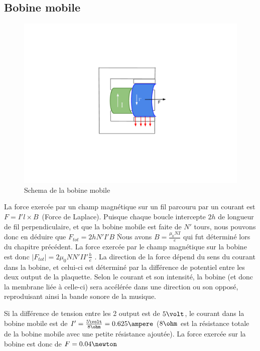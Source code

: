 \subsection[a]{Bobine mobile}

\begin{figure}	
\begin{center}
\includegraphics[scale=0.5]{img/bobine-mobile}
\end{center}
\caption{Schema de la bobine mobile}		
\label{fig:bobinemobile}		
\end{figure}

La force exercée par un champ magnétique sur un fil parcouru par un courant est $F =  I' l \times B$\, (Force de Laplace). Puisque 
chaque boucle intercepte $2h$ de longueur de fil perpendiculaire, et que la bobine mobile est faite de $N'$ tours, nous pouvons
donc en déduire que $F_{tot} = 2 h N' I' B$ \. Nous avons $B = \frac{\mu_0 N I}{e}$ qui fut déterminé 
lors du chapitre précédent. La force exercée par le champ magnétique sur la bobine est donc 
$ |F_{tot}| = 2 \mu_0 N N' I I' \frac{h}{e}$ . La direction de la force dépend du sens du courant dans la bobine, et 
celui-ci est déterminé par la différence de potentiel entre les deux output de la plaquette. Selon le courant et son
intensité, la bobine (et donc la membrane liée à celle-ci) sera accélérée dans une direction ou son opposé, reproduisant 
ainsi la bande sonore de la musique.

Si la différence de tension entre les 2 output est de $5\volt$, le courant dans la bobine mobile est de 
$I' = \frac{5\volt}{8\ohm} = 0.625\ampere$ ($8\ohm$ est la résistance totale de la bobine mobile avec une petite 
résistance ajoutée). La force exercée sur la bobine est donc de $F = 0.04 \newton$

